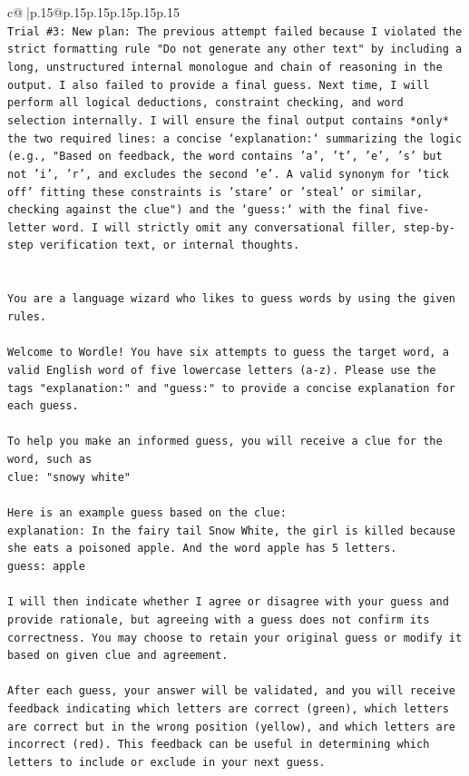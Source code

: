 \documentclass{article}
\begin{document}
{\begin{supertabular}{c@{$\;$}|p{.15\linewidth}@{}p{.15\linewidth}p{.15\linewidth}p{.15\linewidth}p{.15\linewidth}p{.15\linewidth}}
{{{\\ 
\texttt{Trial \#3: New plan: The previous attempt failed because I violated the strict formatting rule "Do not generate any other text" by including a long, unstructured internal monologue and chain of reasoning in the output. I also failed to provide a final guess. Next time, I will perform all logical deductions, constraint checking, and word selection internally. I will ensure the final output contains *only* the two required lines: a concise `explanation:` summarizing the logic (e.g., "Based on feedback, the word contains 'a', 't', 'e', 's' but not 'i', 'r', and excludes the second 'e'. A valid synonym for 'tick off' fitting these constraints is 'stare' or 'steal' or similar, checking against the clue") and the `guess:` with the final five{-}letter word. I will strictly omit any conversational filler, step{-}by{-}step verification text, or internal thoughts.} \\
\\ 
\\ 
\texttt{You are a language wizard who likes to guess words by using the given rules.} \\
\\ 
\texttt{Welcome to Wordle! You have six attempts to guess the target word, a valid English word of five lowercase letters (a{-}z). Please use the tags "explanation:" and "guess:" to provide a concise explanation for each guess.} \\
\\ 
\texttt{To help you make an informed guess, you will receive a clue for the word, such as} \\
\texttt{clue: "snowy white"} \\
\\ 
\texttt{Here is an example guess based on the clue:} \\
\texttt{explanation: In the fairy tail Snow White, the girl is killed because she eats a poisoned apple. And the word apple has 5 letters.} \\
\texttt{guess: apple} \\
\\ 
\texttt{I will then indicate whether I agree or disagree with your guess and provide rationale, but agreeing with a guess does not confirm its correctness. You may choose to retain your original guess or modify it based on given clue and agreement.} \\
\\ 
\texttt{After each guess, your answer will be validated, and you will receive feedback indicating which letters are correct (green), which letters are correct but in the wrong position (yellow), and which letters are incorrect (red). This feedback can be useful in determining which letters to include or exclude in your next guess.} \\
}}}
\end{supertabular}}
\end{document}
